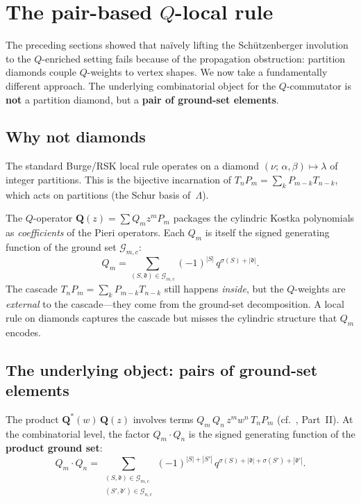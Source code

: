 \documentclass[11pt]{article}
\newcommand{\La}{\Lambda}
\theoremstyle{plain}
\theoremstyle{definition}
\begin{document}
\section{The pair-based $Q$-local rule}
\label{sec:pair-rule}

The preceding sections showed that na\"ively lifting the
Sch\"utzenberger involution to the $Q$-enriched setting fails
because of the propagation obstruction: partition diamonds couple
$Q$-weights to vertex shapes.  We now take a fundamentally
different approach.  The underlying combinatorial object for the
$Q$-commutator is \textbf{not} a partition diamond, but a
\textbf{pair of ground-set elements}.

\subsection{Why not diamonds}

The standard Burge/RSK local rule operates on a diamond
$(\nu;\, \alpha, \beta) \mapsto \lambda$ of integer partitions.
This is the bijective incarnation of $T_n P_m
= \sum_k P_{m-k} T_{n-k}$, which acts on partitions (the
Schur basis of~$\La$).

The $Q$-operator $\mathbf{Q}(z) = \sum Q_m z^m P_m$ packages
the cylindric Kostka polynomials as \emph{coefficients} of the
Pieri operators.  Each $Q_m$ is itself the signed generating
function of the ground set $\mathcal{G}_{m,c}$:
\begin{equation}\label{eq:Q-ground-set}
  Q_m = \sum_{(S,\mathfrak{d}) \in \mathcal{G}_{m,c}}
    (-1)^{|S|}\, q^{\sigma(S) + |\mathfrak{d}|}.
\end{equation}
The cascade $T_n P_m = \sum_k P_{m-k} T_{n-k}$ still happens
\emph{inside}, but the $Q$-weights are \emph{external} to the
cascade---they come from the ground-set decomposition.  A local
rule on diamonds captures the cascade but misses the cylindric
structure that $Q_m$ encodes.


\subsection{The underlying object: pairs of ground-set elements}

The product $\mathbf{Q}^*(w)\,\mathbf{Q}(z)$ involves terms
$Q_m\, Q_n\, z^m w^n\, T_n P_m$ (cf.~\cite{ADJOINT}, Part~II).
At the combinatorial level, the factor $Q_m \cdot Q_n$ is the
signed generating function of the \textbf{product ground set}:
\begin{equation}\label{eq:product-ground-set}
  Q_m \cdot Q_n
  = \sum_{\substack{(S,\mathfrak{d}) \in \mathcal{G}_{m,c} \\
    (S',\mathfrak{d}') \in \mathcal{G}_{n,c}}}
    (-1)^{|S|+|S'|}\,
    q^{\sigma(S) + |\mathfrak{d}| + \sigma(S') + |\mathfrak{d}'|}.
\end{equation}
\end{document}
